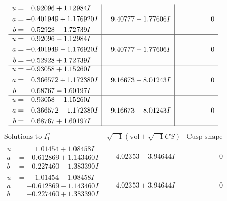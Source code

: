\documentclass[1p]{elsarticle_modified}
\theoremstyle{definition}
\newcommand{\I}{\sqrt{-1}}
\begin{document}
$$\begin{array}{c|c|c}
\begin{aligned}
u &= \phantom{-}0.92096 + 1.12984 I \\
a &= -0.401949 + 1.176920 I \\
b &= -0.52928 - 1.72739 I\end{aligned}
 & \phantom{-}9.40777 - 1.77606 I & \phantom{-0.000000 } 0 \\ \hline\begin{aligned}
u &= \phantom{-}0.92096 - 1.12984 I \\
a &= -0.401949 - 1.176920 I \\
b &= -0.52928 + 1.72739 I\end{aligned}
 & \phantom{-}9.40777 + 1.77606 I & \phantom{-0.000000 } 0 \\ \hline\begin{aligned}
u &= -0.93058 + 1.15260 I \\
a &= \phantom{-}0.366572 + 1.172380 I \\
b &= \phantom{-}0.68767 - 1.60197 I\end{aligned}
 & \phantom{-}9.16673 + 8.01243 I & \phantom{-0.000000 } 0 \\ \hline\begin{aligned}
u &= -0.93058 - 1.15260 I \\
a &= \phantom{-}0.366572 - 1.172380 I \\
b &= \phantom{-}0.68767 + 1.60197 I\end{aligned}
 & \phantom{-}9.16673 - 8.01243 I & \phantom{-0.000000 } 0\\
 \hline 
 \end{array}$$\newpage$$\begin{array}{c|c|c}  
\text{Solutions to }I^u_{1}& \I (\text{vol} + \sqrt{-1}CS) & \text{Cusp shape}\\
 \hline 
\begin{aligned}
u &= \phantom{-}1.01454 + 1.08458 I \\
a &= -0.612869 + 1.143460 I \\
b &= -0.227460 - 1.383390 I\end{aligned}
 & \phantom{-}4.02353 - 3.94644 I & \phantom{-0.000000 } 0 \\ \hline\begin{aligned}
u &= \phantom{-}1.01454 - 1.08458 I \\
a &= -0.612869 - 1.143460 I \\
b &= -0.227460 + 1.383390 I\end{aligned}
 & \phantom{-}4.02353 + 3.94644 I & \phantom{-0.000000 } 0 \\ \hline\begin{aligned}

\end{aligned}
\end{array}$$
\end{document}

